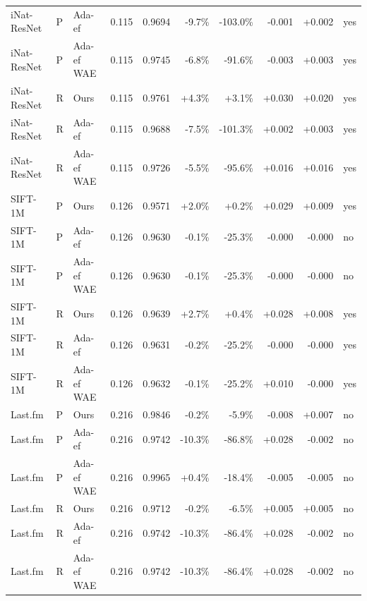 \begin{tabular}{lllrrrrrrl}
iNat-ResNet & P & Ada-ef & 0.115 & 0.9694 & -9.7\% & -103.0\% & -0.001 & +0.002 & yes \\
iNat-ResNet & P & Ada-ef WAE & 0.115 & 0.9745 & -6.8\% & -91.6\% & -0.003 & +0.003 & yes \\
iNat-ResNet & R & Ours & 0.115 & 0.9761 & +4.3\% & +3.1\% & +0.030 & +0.020 & yes \\
iNat-ResNet & R & Ada-ef & 0.115 & 0.9688 & -7.5\% & -101.3\% & +0.002 & +0.003 & yes \\
iNat-ResNet & R & Ada-ef WAE & 0.115 & 0.9726 & -5.5\% & -95.6\% & +0.016 & +0.016 & yes \\
SIFT-1M & P & Ours & 0.126 & 0.9571 & +2.0\% & +0.2\% & +0.029 & +0.009 & yes \\
SIFT-1M & P & Ada-ef & 0.126 & 0.9630 & -0.1\% & -25.3\% & -0.000 & -0.000 & no \\
SIFT-1M & P & Ada-ef WAE & 0.126 & 0.9630 & -0.1\% & -25.3\% & -0.000 & -0.000 & no \\
SIFT-1M & R & Ours & 0.126 & 0.9639 & +2.7\% & +0.4\% & +0.028 & +0.008 & yes \\
SIFT-1M & R & Ada-ef & 0.126 & 0.9631 & -0.2\% & -25.2\% & -0.000 & -0.000 & yes \\
SIFT-1M & R & Ada-ef WAE & 0.126 & 0.9632 & -0.1\% & -25.2\% & +0.010 & -0.000 & yes \\
Last.fm & P & Ours & 0.216 & 0.9846 & -0.2\% & -5.9\% & -0.008 & +0.007 & no \\
Last.fm & P & Ada-ef & 0.216 & 0.9742 & -10.3\% & -86.8\% & +0.028 & -0.002 & no \\
Last.fm & P & Ada-ef WAE & 0.216 & 0.9965 & +0.4\% & -18.4\% & -0.005 & -0.005 & no \\
Last.fm & R & Ours & 0.216 & 0.9712 & -0.2\% & -6.5\% & +0.005 & +0.005 & no \\
Last.fm & R & Ada-ef & 0.216 & 0.9742 & -10.3\% & -86.4\% & +0.028 & -0.002 & no \\
Last.fm & R & Ada-ef WAE & 0.216 & 0.9742 & -10.3\% & -86.4\% & +0.028 & -0.002 & no \\
\bottomrule
\end{tabular}
